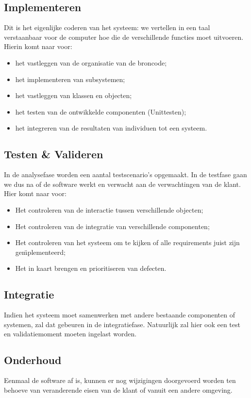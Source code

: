 \subsection{Implementeren}
Dit is het eigenlijke coderen van het systeem: we vertellen in een taal verstaanbaar voor de computer hoe die de verschillende functies moet uitvoeren.
Hierin komt naar voor:
 
 \begin{itemize}
		\item het vastleggen van de organisatie van de broncode;
		\item het implementeren van subsystemen;
		\item het vastleggen van klassen en objecten;
		\item het testen van de ontwikkelde componenten (Unittesten);
		\item het integreren van de resultaten van individuen tot een systeem.
\end{itemize}


\subsection{Testen \& Valideren}
In de analysefase worden een aantal testscenario's opgemaakt. In de testfase gaan we dus na of de software werkt en verwacht aan de verwachtingen van de klant. Hier komt naar voor:
\begin{itemize}
	\item Het controleren van de interactie tussen verschillende objecten;
	\item Het controleren van de integratie van verschillende componenten;
	\item Het controleren van het systeem om te kijken of alle requirements juist zijn ge\"mplementeerd;
	\item Het in kaart brengen en prioritiseren van defecten.
\end{itemize}

\subsection{Integratie}
Indien het systeem moet samenwerken met andere bestaande componenten of systemen, zal dat gebeuren in de integratiefase. Natuurlijk zal hier ook een test en validatiemoment moeten ingelast worden.

\subsection{Onderhoud}
Eenmaal de software af is, kunnen er nog wijzigingen doorgevoerd worden ten behoeve van veranderende eisen van de klant of vanuit een andere omgeving. 

